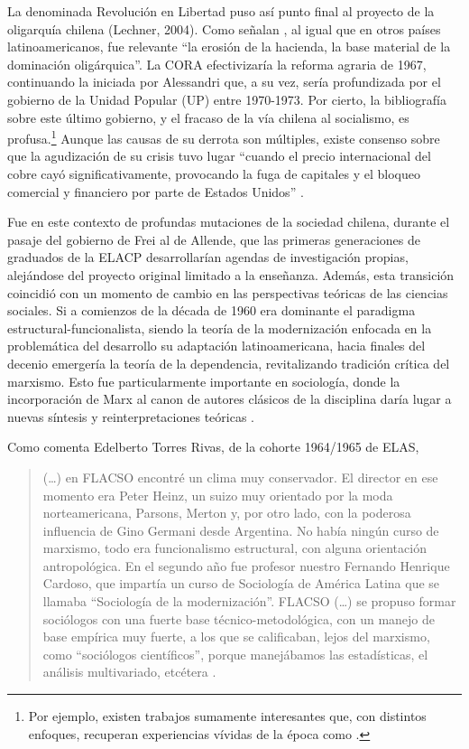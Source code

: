 La denominada Revolución en Libertad puso así punto final al proyecto de la oligarquía chilena (Lechner, 2004). Como señalan \textcite[613-614]{1518-ANSALDI2012}, al igual que en otros países latinoamericanos, fue relevante \enquote{la erosión de la hacienda, la base material de la dominación oligárquica}. La CORA efectivizaría la reforma agraria de 1967, continuando la iniciada por Alessandri que, a su vez, sería profundizada por el gobierno de la Unidad Popular (UP) entre 1970-1973. Por cierto, la bibliografía sobre este último gobierno, y el fracaso de la vía chilena al socialismo, es profusa.\footnote{Por ejemplo, existen trabajos sumamente interesantes que, con distintos enfoques, recuperan experiencias vívidas de la época como \textcite{1503-TOURAINE1974,1630-GARCES2013}.} Aunque las causas de su derrota son múltiples, existe consenso sobre que la agudización de su crisis tuvo lugar \enquote{cuando el precio internacional del cobre cayó significativamente, provocando la fuga de capitales y el bloqueo comercial y financiero por parte de Estados Unidos} \parencite[408]{1519-ANSALDI2012}.

Fue en este contexto de profundas mutaciones de la sociedad chilena, durante el pasaje del gobierno de Frei al de Allende, que las primeras generaciones de graduados de la ELACP desarrollarían agendas de investigación propias, alejándose del proyecto original limitado a la enseñanza. Además, esta transición coincidió con un momento de cambio en las perspectivas teóricas de las ciencias sociales. Si a comienzos de la década de 1960 era dominante el paradigma estructural-funcionalista, siendo la teoría de la modernización enfocada en la problemática del desarrollo su adaptación latinoamericana, hacia finales del decenio emergería la teoría de la dependencia, revitalizando tradición crítica del marxismo. Esto fue particularmente importante en sociología, donde la incorporación de Marx al canon de autores clásicos de la disciplina daría lugar a nuevas síntesis y reinterpretaciones teóricas \parencite{1516-ALEXANDER2008}.

Como comenta Edelberto Torres Rivas, de la cohorte 1964/1965 de ELAS,

\begin{quote}
(\dots) en FLACSO encontré un clima muy conservador. El director en ese momento era Peter Heinz, un suizo muy orientado por la moda norteamericana, Parsons, Merton y, por otro lado, con la poderosa influencia de Gino Germani desde Argentina. No había ningún curso de marxismo, todo era funcionalismo estructural, con alguna orientación antropológica. En el segundo año fue profesor nuestro Fernando Henrique Cardoso, que impartía un curso de Sociología de América Latina que se llamaba \enquote{Sociología de la modernización}. FLACSO (\dots) se propuso formar sociólogos con una fuerte base técnico-metodológica, con un manejo de base empírica muy fuerte, a los que se calificaban, lejos del marxismo, como \enquote{sociólogos científicos}, porque manejábamos las estadísticas, el análisis multivariado, etcétera \parencite[111]{1520-BATAILLON2006}.
\end{quote}

